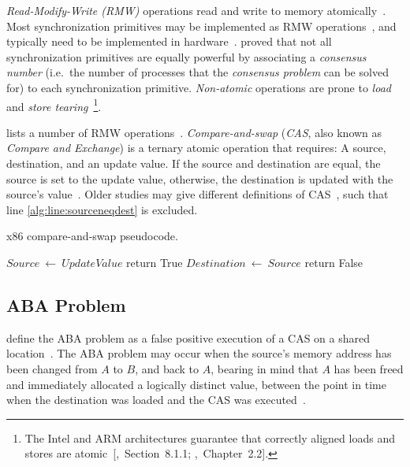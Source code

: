 \emph{Read-Modify-Write (RMW)} operations read and write to memory
atomically~\citep{perfbook2021}. Most synchronization primitives may be
implemented as RMW operations~\citep[Section~5.6]{herlihy2020art}, and
typically need to be implemented in hardware~\citep[Appendix~B.8]{herlihy2020art}.
\citeauthor{herlihy1991wait} proved that not all synchronization primitives are
equally powerful by associating a \emph{consensus number} (i.e.~the number of
processes that the \emph{consensus problem} can be solved for) to each
synchronization primitive. \emph{Non-atomic} operations are prone to \emph{load} and \emph{store
tearing}~\citep[Section~4.3.4]{perfbook2021}\footnote{The Intel and ARM
architectures guarantee that correctly aligned loads and stores are
atomic~[\citealp{intel2021system},~Section~8.1.1;
\citealp{arm2022architecture},~Chapter~2.2].}.

\citeauthor{scott2013shared} lists a number of RMW operations~\citep[Table~2.2]{scott2013shared}.
\emph{Compare-and-swap} (\emph{CAS}, also known as \emph{Compare and Exchange})
is a ternary atomic operation that requires: A source, destination, and an
update value. If the source and destination are equal, the source is set to the
update value, otherwise, the destination is updated with the source's
value~\citep{intel2021inst}.
Older studies may give different definitions of
CAS~\citetext{\citealp{scott2013shared},~Table~2.2;~\citealp{valois1995datastructures},
Appendix~A}, such that line \ref{alg:line:sourceneqdest} is excluded.

\begin{algorithm}
    \caption{x86 compare-and-swap pseudocode.}\label{alg:cas}
    \begin{algorithmic}[1]
                \State $Source~\gets~UpdateValue$
                \State return True
            \EndIf
            \State $Destination~\gets~Source$ \label{alg:line:sourceneqdest}
            \State return False
        \EndFunction
    \end{algorithmic}
\end{algorithm}


\subsection{ABA Problem}
\citeauthor{dechev2010understanding} define the ABA problem as a false positive
execution of a CAS on a shared location~\citep{dechev2010understanding}. The ABA
problem may occur when the source's memory address has been changed from $A$ to
$B$, and back to $A$, bearing in mind that $A$ has been freed and immediately
allocated a logically distinct value, between the point in time when the
destination was loaded and the CAS was executed~\citep{dechev2010understanding}.

